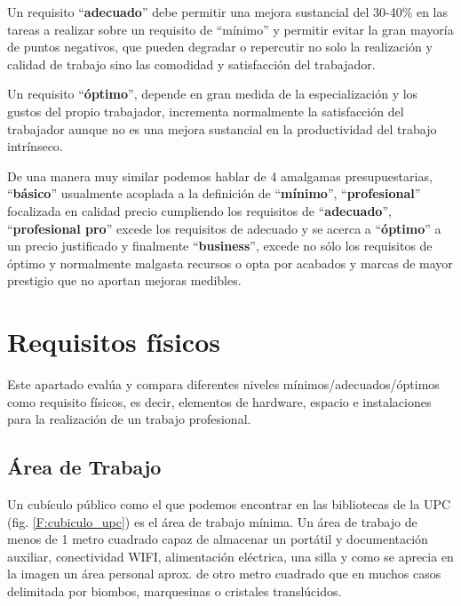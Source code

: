 Un  requisito “\textbf{adecuado}” debe permitir una mejora sustancial del 30-40\% en las tareas a realizar sobre un requisito de “mínimo” y permitir evitar la gran mayoría de puntos negativos, que pueden degradar o repercutir no solo la realización y calidad de trabajo sino las comodidad y satisfacción del trabajador.

Un  requisito “\textbf{óptimo}”, depende en gran medida de la especialización y los gustos del propio trabajador, incrementa normalmente la satisfacción del trabajador aunque no es una mejora sustancial en la productividad del trabajo intrínseco.

De una manera muy similar podemos hablar de 4 amalgamas presupuestarias, “\textbf{básico}” usualmente acoplada a la definición de “\textbf{mínimo}”, “\textbf{profesional}” focalizada en calidad precio cumpliendo los requisitos de “\textbf{adecuado}”, “\textbf{profesional pro}” excede los requisitos de adecuado y se acerca a “\textbf{óptimo}” a un precio justificado y finalmente “\textbf{business}”, excede no sólo los requisitos de óptimo y normalmente malgasta recursos o opta por acabados y marcas de mayor prestigio que no aportan mejoras medibles.

\section{Requisitos físicos}

Este apartado evalúa y compara diferentes niveles mínimos/adecuados/óptimos como requisito físicos, es decir, elementos de hardware, espacio e instalaciones para la realización de un trabajo profesional.

\subsection{Área de Trabajo}
Un cubículo público como el que podemos encontrar en las bibliotecas de la UPC (fig. \ref{F:cubiculo_upc}) es el área de trabajo mínima. Un área de trabajo de menos de 1 metro cuadrado capaz de almacenar un portátil y documentación auxiliar, conectividad WIFI, alimentación eléctrica, una silla y como se aprecia en la imagen un área personal aprox. de otro metro cuadrado que en muchos casos delimitada por biombos, marquesinas o cristales translúcidos. 

